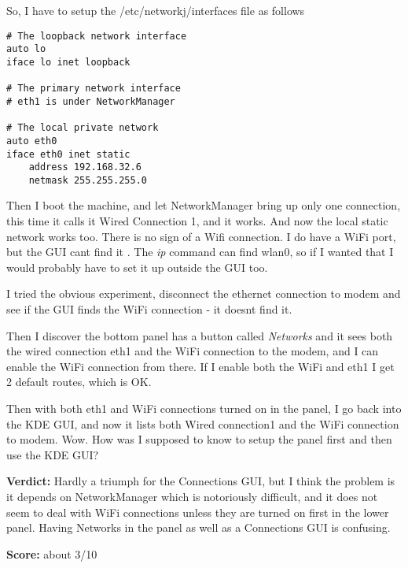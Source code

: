 \documentclass{article}  %
\begin{document}
So, I have to setup the /etc/networkj/interfaces file as follows
\begin{verbatim}
# The loopback network interface
auto lo
iface lo inet loopback

# The primary network interface
# eth1 is under NetworkManager

# The local private network
auto eth0
iface eth0 inet static
    address 192.168.32.6
    netmask 255.255.255.0
\end{verbatim} 
Then I boot the machine, and let NetworkManager bring up only one connection, this time it calls it Wired Connection 1, and it works. And now the local static network works too. 
There is no sign of a Wifi connection.  I do have a WiFi port, but the GUI cant find it . The {\em ip} command can find wlan0, so if I wanted that I would probably have to set it up outside the GUI too. 
 
I tried the obvious experiment, disconnect the ethernet connection to modem and see if the GUI finds the WiFi connection - it doesnt find it. 

Then I discover the bottom panel has a  button called {\em Networks} and it sees both the wired connection eth1 and  the WiFi connection to the modem, and I can enable the WiFi connection from there. If I enable both the WiFi and eth1 I get 2 default routes, which is OK.

Then with both eth1 and WiFi connections turned on in the panel, I go back into the KDE GUI, and now it lists both Wired connection1 and the WiFi connection to modem. Wow. How was I supposed to know to setup the panel first and then use the KDE GUI?

{\bf Verdict:}  Hardly a triumph for the Connections GUI, but I think the problem is it depends on NetworkManager which is notoriously difficult, and it does not seem to deal with WiFi connections unless they are turned on first in the lower panel. Having Networks in the panel as well as a Connections GUI is confusing.

{\bf Score:} about 3/10
\end{document}
